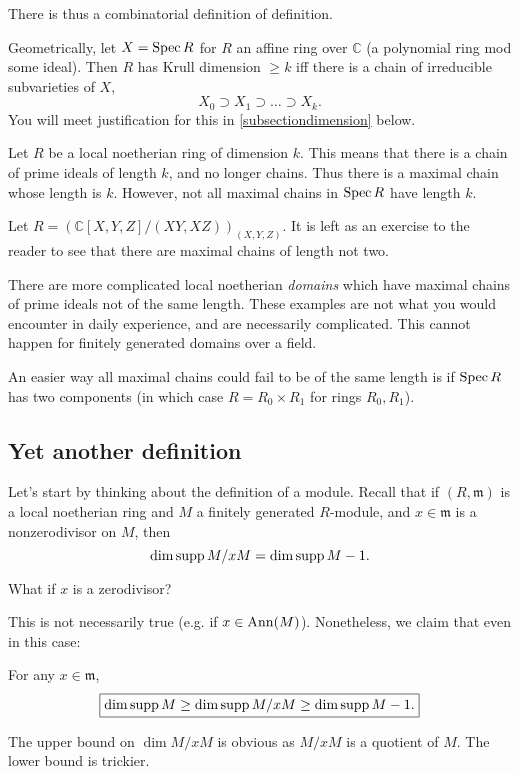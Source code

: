 There is thus a combinatorial definition of definition.

Geometrically, let $X = \operatorname{Spec} R$ for $R$ an affine ring over $\mathbb{C}$ (a
polynomial ring mod some ideal). Then $R$ has Krull dimension $\geq k$ iff there is a
chain of irreducible subvarieties of $X$,
\[ X_0 \supset X_1 \supset \dots \supset X_k . \]
You will meet justification for this in \ref{subsectiondimension} below.

\begin{remark} Let $R$ be a local noetherian ring of dimension $k$. This
means that there is a chain of prime ideals of length $k$, and no longer
chains. Thus there is a maximal chain whose length is $k$. However, not all
maximal chains in $\operatorname{Spec} R$ have length $k$. 
\end{remark} 

\begin{example} 
Let $R =( \mathbb{C}[X,Y,Z]/(XY,XZ))_{(X,Y,Z)}$. It is left as an
exercise to the reader to see that there are maximal chains of
length not two.

There are more complicated local noetherian \emph{domains} which have maximal
chains of prime ideals not of the same length. These examples are not what you
would encounter in daily experience, and are necessarily complicated. This
cannot happen for finitely generated domains over a field.
\end{example} 

\begin{example} 
An easier way all maximal chains could fail to be of the same length is if
$\operatorname{Spec} R$ has two components (in which case $R = R_0 \times R_1$ for rings
$R_0, R_1$). 
\end{example} 


\subsection{Yet another definition}
Let's start by thinking about the definition of a module. Recall that if $(R,
\mathfrak{m})$ is
a local noetherian ring and $M$ a finitely generated $R$-module, and $x \in \mathfrak{m}$ is
a nonzerodivisor on $M$, then
\[ \dim \operatorname{supp} M/xM = \dim \operatorname{supp} M -1.  \]

\begin{question} 
What if $x$ is  a zerodivisor? 
\end{question} 

This is not necessarily true (e.g. if $x \in \operatorname{Ann}(M)$). Nonetheless, we claim
that even in this case:
\begin{proposition} 
For any $x \in \mathfrak{m}$,
\[ \boxed{ \dim \operatorname{supp} M \geq \dim \operatorname{supp} M/xM \geq \dim \operatorname{supp} M -1 .}\]
\end{proposition} 
The upper bound on $\dim M/xM$ is obvious as $M/xM$ is a quotient of $M$. The
lower bound is trickier. 


